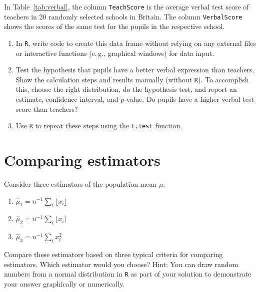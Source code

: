 \documentclass[a4paper,11pt]{article}
\begin{document}
In Table~\ref{tab:verbal}, the column \texttt{TeachScore} is the average verbal test score of teachers in 20 randomly selected schools in Britain. The column \texttt{VerbalScore} shows the scores of the same test for the pupils in the respective school.

\begin{enumerate}
 \item In \texttt{R}, write code to create this data frame without relying on any external files or interactive functions (e.\,g., graphical windows) for data input.
 \item Test the hypothesis that pupils have a better verbal expression than teachers. Show the calculation steps and results manually (without \texttt{R}). To accomplish this, choose the right distribution, do the hypothesis test, and report an estimate, confidence interval, and $p$-value. Do pupils have a higher verbal test score than teachers?
 \item Use \texttt{R} to repeat these steps using the \texttt{t.test} function.
\end{enumerate}


\section{Comparing estimators}
Consider three estimators of the population mean $\mu$:
\begin{enumerate}
 \item $\hat{\mu}_1 = n^{-1} \sum_i \lfloor x_i \rfloor$
 \item $\hat{\mu}_2 = n^{-1} \sum_i \lfloor x_i \rceil$
 \item $\hat{\mu}_3 = n^{-1} \sum_i x_i^2$
\end{enumerate}
Compare these estimators based on three typical criteria for comparing estimators. Which estimator would you choose? Hint: You can draw random numbers from a normal distribution in \texttt{R} as part of your solution to demonstrate your answer graphically or numerically.
\end{document}
